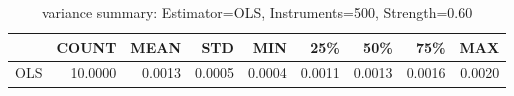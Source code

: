\begin{table}[ht]
\centering
\caption{variance summary: Estimator=OLS, Instruments=500, Strength=0.60}
\begin{tabular}{lrrrrrrrr}
\toprule
 & COUNT & MEAN & STD & MIN & 25\% & 50\% & 75\% & MAX \\
\midrule
OLS & 10.0000 & 0.0013 & 0.0005 & 0.0004 & 0.0011 & 0.0013 & 0.0016 & 0.0020 \\
\bottomrule
\end{tabular}
\end{table}
